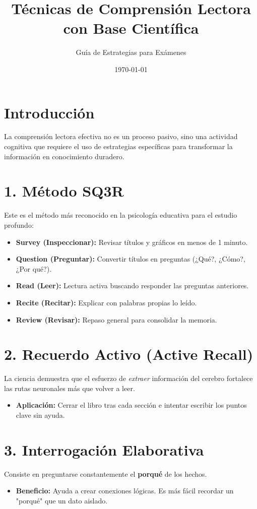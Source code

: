 \documentclass[12pt,a4paper]{article}
\title{\textbf{Técnicas de Comprensión Lectora con Base Científica}}
\author{Guía de Estrategias para Exámenes}
\date{\today}
\begin{document}
\maketitle

\section{Introducción}
La comprensión lectora efectiva no es un proceso pasivo, sino una actividad cognitiva que requiere el uso de estrategias específicas para transformar la información en conocimiento duradero.

\section{1. Método SQ3R}
Este es el método más reconocido en la psicología educativa para el estudio profundo:
\begin{itemize}[label=\checkmark]
    \item \textbf{Survey (Inspeccionar):} Revisar títulos y gráficos en menos de 1 minuto.
    \item \textbf{Question (Preguntar):} Convertir títulos en preguntas (¿Qué?, ¿Cómo?, ¿Por qué?).
    \item \textbf{Read (Leer):} Lectura activa buscando responder las preguntas anteriores.
    \item \textbf{Recite (Recitar):} Explicar con palabras propias lo leído.
    \item \textbf{Review (Revisar):} Repaso general para consolidar la memoria.
\end{itemize}

\section{2. Recuerdo Activo (Active Recall)}
La ciencia demuestra que el esfuerzo de \textit{extraer} información del cerebro fortalece las rutas neuronales más que volver a leer. 
\begin{itemize}
    \item \textbf{Aplicación:} Cerrar el libro tras cada sección e intentar escribir los puntos clave sin ayuda.
\end{itemize}

\section{3. Interrogación Elaborativa}
Consiste en preguntarse constantemente el \textbf{porqué} de los hechos.
\begin{itemize}
    \item \textbf{Beneficio:} Ayuda a crear conexiones lógicas. Es más fácil recordar un "porqué" que un dato aislado.
\end{itemize}
\end{document}
